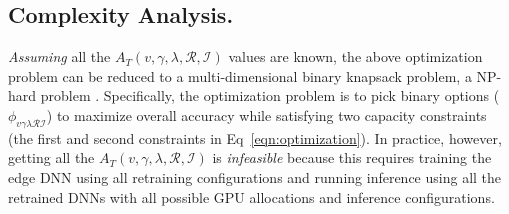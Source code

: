 \subsection{Complexity Analysis.}
\label{complexity-analysis}
\emph{Assuming} all the $A_T(v, \gamma, \lambda, \mathcal{R}, \mathcal{I})$ values are known, the above optimization problem can be reduced to a multi-dimensional binary knapsack problem, a NP-hard problem \cite{DBLP:journals/mor/MagazineC84}. 
Specifically, the optimization problem is to pick binary options ($\phi_{v\gamma\lambda\mathcal{R}\mathcal{I}}$) to maximize overall accuracy while satisfying two capacity constraints (the first and second constraints in Eq~\ref{eqn:optimization}). %
In practice, however, getting all the $A_T(v, \gamma, \lambda, \mathcal{R}, \mathcal{I})$ is \emph{infeasible} 
because this requires training the edge DNN using all retraining configurations and running inference using all the retrained DNNs with all possible GPU allocations and inference configurations.%

